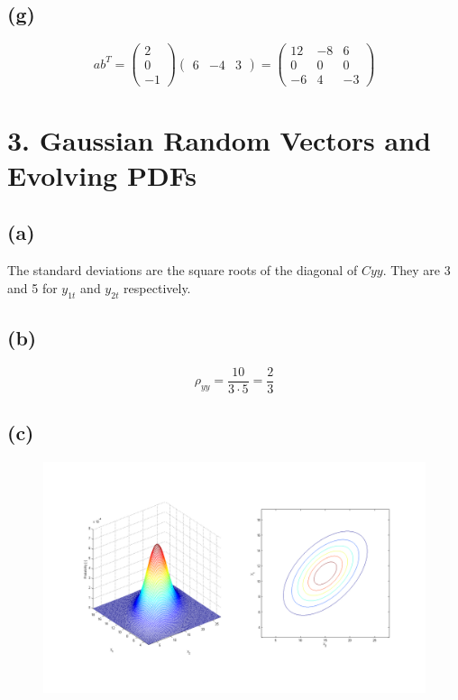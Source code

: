 \documentclass[fleqn, letterpaper]{tufte-handout}
\begin{document}
\subsection{(g)}
\[ab^T=
\left(\begin{array}{c} 2\\ 0\\ -1 \end{array}\right)
\left(\begin{array}{ccc} 6 & -4 & 3 \end{array}\right)
=\left(\begin{array}{ccc} 12 & -8 & 6\\ 0 & 0 & 0\\ -6 & 4 & -3 \end{array}\right)
\]
\section{3. Gaussian Random Vectors and Evolving PDFs}
\subsection{(a)}
The standard deviations are the square roots of the diagonal of $Cyy$. They are 3 and 5 for $y_{1t}$ and $y_{2t}$ respectively.
\subsection{(b)}
\[
        \rho_{yy} = \frac{10}{3\cdot5} = \frac{2}{3}
\]
\subsection{(c)}
\begin{figure}[h!]
        \includegraphics[width=\textwidth]{ps2plot}
\end{figure}
\end{document}
